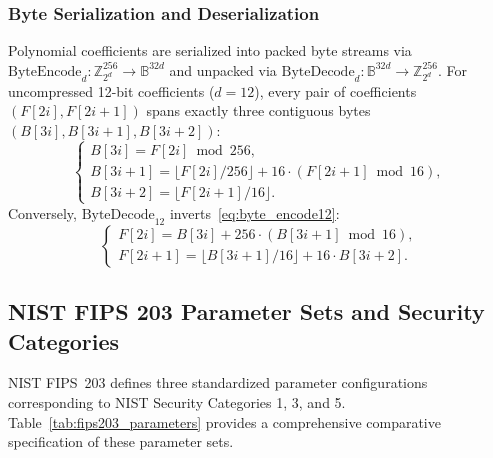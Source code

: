 \subsubsection{Byte Serialization and Deserialization}
Polynomial coefficients are serialized into packed byte streams via $\text{ByteEncode}_d: \mathbb{Z}_{2^d}^{256} \to \mathbb{B}^{32d}$ and unpacked via $\text{ByteDecode}_d: \mathbb{B}^{32d} \to \mathbb{Z}_{2^d}^{256}$. For uncompressed 12-bit coefficients ($d = 12$), every pair of coefficients $(F[2i], F[2i+1])$ spans exactly three contiguous bytes $(B[3i], B[3i+1], B[3i+2])$:
\begin{equation}
\label{eq:byte_encode12}
\begin{cases}
B[3i] = F[2i] \bmod 256, \\
B[3i+1] = \lfloor F[2i]/256 \rfloor + 16 \cdot (F[2i+1] \bmod 16), \\
B[3i+2] = \lfloor F[2i+1]/16 \rfloor.
\end{cases}
\end{equation}
Conversely, $\text{ByteDecode}_{12}$ inverts~\eqref{eq:byte_encode12}:
\begin{equation}
\label{eq:byte_decode12}
\begin{cases}
F[2i] = B[3i] + 256 \cdot (B[3i+1] \bmod 16), \\
F[2i+1] = \lfloor B[3i+1]/16 \rfloor + 16 \cdot B[3i+2].
\end{cases}
\end{equation}

\subsection{NIST FIPS 203 Parameter Sets and Security Categories}
\label{sec:prelim_parameters}

NIST FIPS~203 defines three standardized parameter configurations corresponding to NIST Security Categories 1, 3, and 5. Table~\ref{tab:fips203_parameters} provides a comprehensive comparative specification of these parameter sets.

